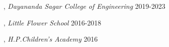 
, \textit{Dayananda Sagar College of Engineering}	\hfill 2019-2023

, \textit{Little Flower School} 	\hfill 2016-2018

, \textit{H.P.Children's Academy} \hfill	2016


